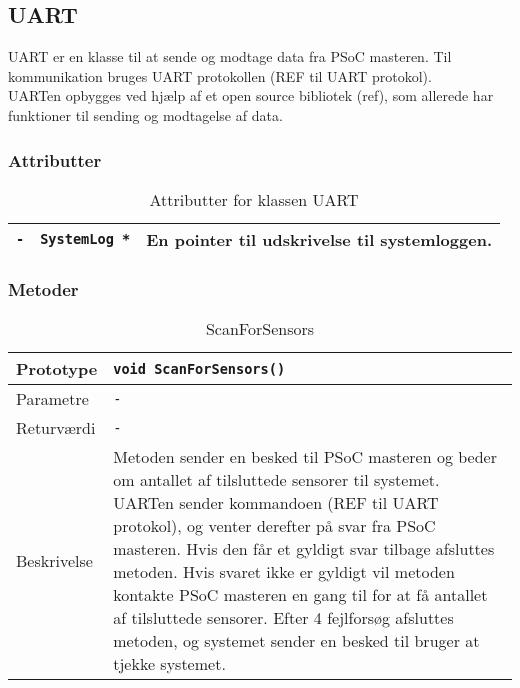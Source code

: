 \subsection{UART}

UART er en klasse til at sende og modtage data fra PSoC masteren. Til kommunikation bruges UART protokollen (REF til UART protokol).\\
UARTen opbygges ved hjælp af et open source bibliotek (ref), som allerede har funktioner til sending og modtagelse af data.

\subsubsection{Attributter}

\begin{table}[h]
\begin{tabularx}{\textwidth}{| L{2.5cm} | l | Z |} \hline
\texttt{-} & \texttt{SystemLog *} & En pointer til udskrivelse til systemloggen. \\\hline
\end{tabularx}
\caption{Attributter for klassen UART}
\label{table:UART_attributter}
\end{table}

\subsubsection{Metoder}

\begin{table}[h]
\begin{tabularx}{\textwidth}{| >{\raggedright\arraybackslash}p{2.5 cm} | >{\raggedright\arraybackslash}X |} \hline
Prototype & \texttt{void ScanForSensors()} \\\hline
Parametre & \texttt{-} \\\hline
Returværdi & \texttt{-} \\\hline
Beskrivelse & Metoden sender en besked til PSoC masteren og beder om antallet af tilsluttede sensorer til systemet. UARTen sender kommandoen (REF til UART protokol), og venter derefter på svar fra PSoC masteren. Hvis den får et gyldigt svar tilbage afsluttes metoden. Hvis svaret ikke er gyldigt vil metoden kontakte PSoC masteren en gang til for at få antallet af tilsluttede sensorer. Efter 4 fejlforsøg afsluttes metoden, og systemet sender en besked til bruger at tjekke systemet. \\\hline
\end{tabularx}
\caption{ScanForSensors}
\label{table:UART_ScanForSensors}
\end{table}


